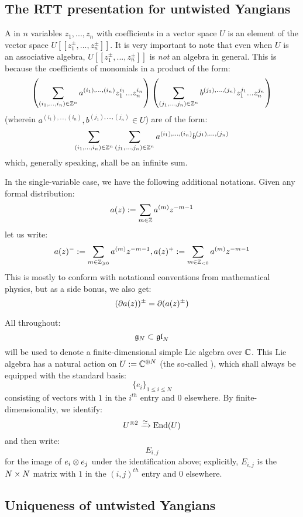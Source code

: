         \begin{definition} \label{def: quantum_determinants}
            
        \end{definition}

    \subsection{The RTT presentation for untwisted Yangians} \label{subsection: RTT_presentation_for_untwisted_yangians}
        A  in $n$ variables $z_1, ..., z_n$ with coefficients in a vector space $U$ is an element of the vector space $U[\![z_1^{\pm}, ..., z_n^{\pm}]\!]$. It is very important to note that even when $U$ is an associative algebra, $U[\![z_1^{\pm}, ..., z_n^{\pm}]\!]$ is \textit{not} an algebra in general. This is because the coefficients of monomials in a product of the form:
            $$\left( \sum_{(i_1, ..., i_n) \in \mathbb{Z}^n} a^{(i_1), ..., (i_n)} z_1^{i_1} ... z_n^{i_n} \right) \left( \sum_{(j_1, ..., j_n) \in \mathbb{Z}^n} b^{(j_1), ..., (j_n)} z_1^{j_1} ... z_n^{j_n} \right)$$
        (wherein $a^{(i_1), ..., (i_n)}, b^{(j_1), ..., (j_n)} \in U$) are of the form:
            $$\sum_{(i_1, ..., i_n) \in \mathbb{Z}^n} \sum_{(j_1, ..., j_n) \in \mathbb{Z}^n} a^{(i_1), ..., (i_n)} b^{(j_1), ..., (j_n)}$$
        which, generally speaking, shall be an infinite sum.
    
        In the single-variable case, we have the following additional notations. Given any formal distribution:
            $$a(z) := \sum_{m \in \mathbb{Z}} a^{(m)} z^{-m - 1}$$
        let us write:
            $$a(z)^- := \sum_{m \in \mathbb{Z}_{\geqslant 0}} a^{(m)} z^{-m - 1}, a(z)^+ := \sum_{m \in \mathbb{Z}_{< 0}} a^{(m)} z^{-m - 1}$$
        This is mostly to conform with notational conventions from mathematical physics, but as a side bonus, we also get:
            $$(\partial a(z))^{\pm} = \partial( a(z)^{\pm} )$$
    
        All throughout:
            $$\mathfrak{g}_N \subset \mathfrak{gl}_N$$
        will be used to denote a finite-dimensional simple Lie algebra over $\mathbb{C}$. This Lie algebra has a natural action on $U := \mathbb{C}^{\oplus N}$ (the so-called ), which shall always be equipped with the standard basis:
            $$\{e_i\}_{1 \leq i \leq N}$$
        consisting of vectors with $1$ in the $i^{th}$ entry and $0$ elsewhere. By finite-dimensionality, we identify:
            $$U^{\tensor 2} \xrightarrow[]{\cong} \End(U)$$
        and then write:
            $$E_{i, j}$$
        for the image of $e_i \tensor e_j$ under the identification above; explicitly, $E_{i, j}$ is the $N \x N$ matrix with $1$ in the $(i, j)^{th}$ entry and $0$ elsewhere.

    \subsection{Uniqueness of untwisted Yangians}